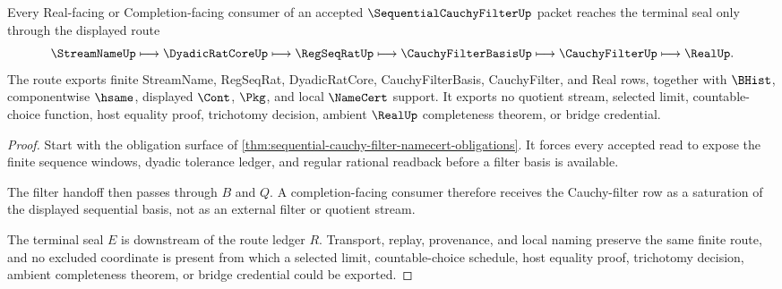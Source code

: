 \begin{theorem}
\label{thm:sequential-cauchy-filter-regseqrat-route}
Every Real-facing or Completion-facing consumer of an accepted $\SequentialCauchyFilterUp$ packet reaches the terminal seal only through the displayed route
$$
\StreamNameUp \longmapsto \DyadicRatCoreUp \longmapsto \RegSeqRatUp \longmapsto \CauchyFilterBasisUp \longmapsto \CauchyFilterUp \longmapsto \RealUp .
$$
The route exports finite StreamName, RegSeqRat, DyadicRatCore, CauchyFilterBasis, CauchyFilter, and Real rows, together with $\BHist$, componentwise $\hsame$, displayed $\Cont$, $\Pkg$, and local $\NameCert$ support. It exports no quotient stream, selected limit, countable-choice function, host equality proof, trichotomy decision, ambient $\RealUp$ completeness theorem, or bridge credential.
\end{theorem}
\begin{proof}
Start with the obligation surface of \autoref{thm:sequential-cauchy-filter-namecert-obligations}. It forces every accepted read to expose the finite sequence windows, dyadic tolerance ledger, and regular rational readback before a filter basis is available.

The filter handoff then passes through $B$ and $Q$. A completion-facing consumer therefore receives the Cauchy-filter row as a saturation of the displayed sequential basis, not as an external filter or quotient stream.

The terminal seal $E$ is downstream of the route ledger $R$. Transport, replay, provenance, and local naming preserve the same finite route, and no excluded coordinate is present from which a selected limit, countable-choice schedule, host equality proof, trichotomy decision, ambient completeness theorem, or bridge credential could be exported.
\end{proof}



